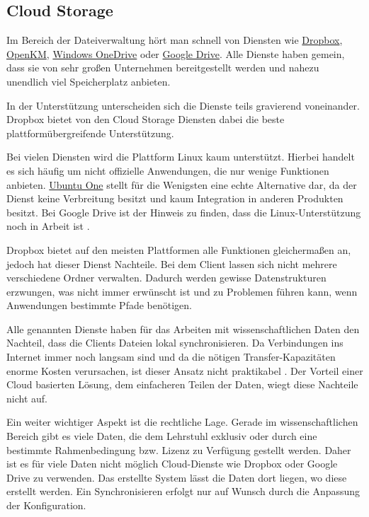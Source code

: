 \documentclass[oneside, ngerman, toc=bibliography,bibliography=totoc,listof=entryprefix, open=right,numbers=noenddot,fontsize=12pt]{scrbook}
\begin{document}
\subsection{Cloud Storage}
Im Bereich der Dateiverwaltung hört man schnell von Diensten wie \href{https://www.dropbox.com/de/}{{Dropbox}}, \href{http://www.openkm.com/en/}{{OpenKM}},
\href{https://onedrive.live.com/}{{Windows OneDrive}} oder  \href{https://www.google.com/intl/de_de/drive/}{{Google Drive}}.
Alle Dienste haben gemein, dass sie von sehr großen Unternehmen bereitgestellt werden und nahezu unendlich viel Speicherplatz anbieten. 

In der Unterstützung unterscheiden sich die Dienste teils gravierend voneinander. {Dropbox} bietet von den Cloud Storage Diensten dabei die beste plattformübergreifende Unterstützung.

Bei vielen Diensten wird die Plattform Linux kaum unterstützt. Hierbei handelt es sich häufig um nicht offizielle Anwendungen, die nur wenige Funktionen anbieten. \href{https://one.ubuntu.com/}{Ubuntu One} stellt für die Wenigsten eine echte Alternative dar, da der Dienst keine Verbreitung besitzt und kaum Integration in anderen Produkten besitzt. Bei {Google Drive} ist der Hinweis zu finden, dass die Linux-Unterstützung noch in Arbeit ist \cite{googledrive}.

{Dropbox} bietet auf den meisten Plattformen alle Funktionen gleichermaßen an, jedoch hat dieser Dienst Nachteile.
Bei dem Client lassen sich nicht mehrere verschiedene Ordner verwalten. Dadurch werden gewisse Datenstrukturen erzwungen, was nicht immer erwünscht ist und zu Problemen führen kann, wenn Anwendungen bestimmte Pfade benötigen.

Alle genannten Dienste haben für das Arbeiten mit wissenschaftlichen Daten den Nachteil, dass die Clients Dateien lokal synchronisieren. Da Verbindungen ins Internet immer noch langsam sind und da die nötigen Transfer-Kapazitäten enorme Kosten verursachen, ist dieser Ansatz nicht praktikabel \cite{telekomlahr}. Der Vorteil einer Cloud basierten Lösung, dem einfacheren Teilen der Daten, wiegt diese Nachteile nicht auf.

Ein weiter wichtiger Aspekt ist die rechtliche Lage. Gerade im wissenschaftlichen Bereich gibt es viele Daten, die dem Lehrstuhl exklusiv oder durch eine bestimmte Rahmenbedingung bzw. Lizenz zu Verfügung gestellt werden. 
Daher ist es für viele Daten nicht möglich Cloud-Dienste wie Dropbox oder Google Drive zu verwenden. 
Das erstellte System lässt die Daten dort liegen, wo diese erstellt werden. Ein Synchronisieren erfolgt nur auf Wunsch durch die Anpassung der Konfiguration.
\end{document}
